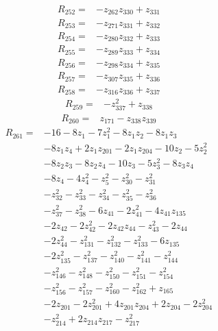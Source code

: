 \begin{align*}
R_{252}={}&-z_{262}z_{330}+z_{331}
\end{align*}
\begin{align*}
R_{253}={}&-z_{271}z_{331}+z_{332}
\end{align*}
\begin{align*}
R_{254}={}&-z_{280}z_{332}+z_{333}
\end{align*}
\begin{align*}
R_{255}={}&-z_{289}z_{333}+z_{334}
\end{align*}
\begin{align*}
R_{256}={}&-z_{298}z_{334}+z_{335}
\end{align*}
\begin{align*}
R_{257}={}&-z_{307}z_{335}+z_{336}
\end{align*}
\begin{align*}
R_{258}={}&-z_{316}z_{336}+z_{337}
\end{align*}
\begin{align*}
R_{259}={}&-z_{337}^{2}+z_{338}
\end{align*}
\begin{align*}
R_{260}={}&z_{171}-z_{338}z_{339}
\end{align*}
\begin{align*}
R_{261}={}&-16-8z_{1}-7z_{1}^{2}-8z_{1}z_{2}-8z_{1}z_{3}\\
&-8z_{1}z_{4}+2z_{1}z_{201}-2z_{1}z_{204}-10z_{2}-5z_{2}^{2}\\
&-8z_{2}z_{3}-8z_{2}z_{4}-10z_{3}-5z_{3}^{2}-8z_{3}z_{4}\\
&-8z_{4}-4z_{4}^{2}-z_{5}^{2}-z_{30}^{2}-z_{31}^{2}\\
&-z_{32}^{2}-z_{33}^{2}-z_{34}^{2}-z_{35}^{2}-z_{36}^{2}\\
&-z_{37}^{2}-z_{38}^{2}-6z_{41}-2z_{41}^{2}-4z_{41}z_{135}\\
&-2z_{42}-2z_{42}^{2}-2z_{42}z_{44}-z_{43}^{2}-2z_{44}\\
&-2z_{44}^{2}-z_{131}^{2}-z_{132}^{2}-z_{133}^{2}-6z_{135}\\
&-2z_{135}^{2}-z_{137}^{2}-z_{140}^{2}-z_{141}^{2}-z_{144}^{2}\\
&-z_{146}^{2}-z_{148}^{2}-z_{150}^{2}-z_{151}^{2}-z_{154}^{2}\\
&-z_{156}^{2}-z_{157}^{2}-z_{160}^{2}-z_{162}^{2}+z_{165}\\
&-2z_{201}-2z_{201}^{2}+4z_{201}z_{204}+2z_{204}-2z_{204}^{2}\\
&-z_{214}^{2}+2z_{214}z_{217}-z_{217}^{2}
\end{align*}
